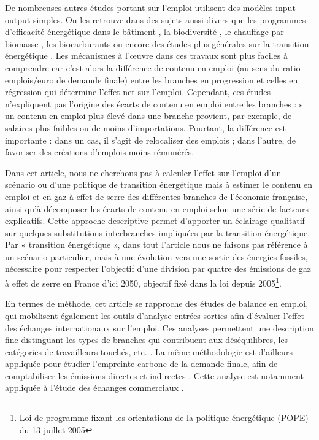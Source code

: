 De nombreuses autres études portant sur l'emploi utilisent des modèles input-output simples. On les retrouve dans des sujets aussi divers que les programmes d'efficacité énergétique dans le bâtiment \citep{Scott2008}, la biodiversité \citep{DeBeir2015}, le chauffage par biomasse \citep{Madlener2007}, les biocarburants \citep{Neuwahl2008} ou encore des études plus générales sur la transition énergétique \citep{Quirion2013}. 
Les mécanismes à l’œuvre dans ces travaux sont plus faciles à comprendre car c’est alors la différence de contenu en emploi (au sens du ratio emplois/euro de demande finale) entre les branches en progression et celles en régression qui détermine l’effet net sur l’emploi. Cependant, ces études n’expliquent pas l’origine des écarts de contenu en emploi entre les branches : si un contenu en emploi plus élevé dans une branche provient, par exemple, de salaires plus faibles ou de moins d’importations. 
Pourtant, la différence est importante : dans un cas, il s’agit de relocaliser des emplois ; dans l’autre, de favoriser des créations d’emplois moins rémunérés.

Dans cet article, nous ne cherchons pas à calculer l’effet sur l’emploi d’un scénario ou d’une politique de transition énergétique mais à estimer le contenu en emploi et en gaz à effet de serre des différentes branches de l’économie française, ainsi qu’à décomposer les écarts de contenu en emploi selon une série de facteurs explicatifs. Cette approche descriptive permet d’apporter un éclairage qualitatif sur quelques substitutions interbranches impliquées par la transition énergétique. Par « transition énergétique », dans tout l’article nous ne faisons pas référence à un scénario particulier, mais à une évolution vers une sortie des énergies fossiles, nécessaire pour respecter l’objectif d’une division par quatre des émissions de gaz à effet de serre en France d’ici 2050, objectif fixé dans la loi depuis 2005\footnote{Loi de programme fixant les orientations de la politique énergétique (POPE) du 13 juillet 2005}.

En termes de méthode, cet article se rapproche des études de balance en emploi, qui mobilisent également les outils d’analyse entrées-sorties afin d’évaluer l’effet des échanges internationaux sur l’emploi. Ces analyses permettent une description fine distinguant les types de branches qui contribuent aux déséquilibres, les catégories de travailleurs touchés, etc. \citep{Guimbert2002}. La même méthodologie est d’ailleurs appliquée pour étudier l’empreinte carbone de la demande finale, afin de comptabiliser les émissions directes et indirectes \citep{Xu2014, Lenglart2010}. Cette analyse est notamment appliquée à l’étude des échanges commerciaux \citep{Dong2010}.


